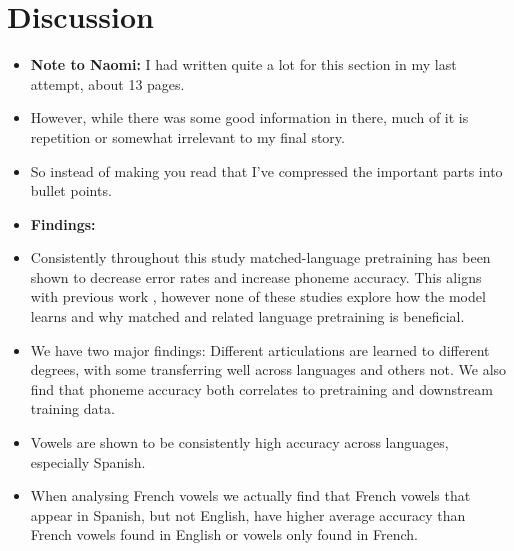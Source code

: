 \section{Discussion}\label{ed_sec:discussion}
\begin{itemize}
    \item \textbf{Note to Naomi:} I had written quite a lot for this section in my last attempt, about 13 pages.
    \item However, while there was some good information in there, much of it is repetition or somewhat irrelevant to my final story.
    \item So instead of making you read that I've compressed the important parts into bullet points.
    \item \textbf{Findings:}
    \item Consistently throughout this study matched-language pretraining has been shown to decrease error rates and increase phoneme accuracy. This aligns with previous work \cite{ashihara2023exploration, poncelet2021comparison, zhang2023fast, gupta2021clsril}, however none of these studies explore how the model learns and why matched and related language pretraining is beneficial.
    \item We have two major findings: Different articulations are learned to different degrees, with some transferring well across languages and others not. We also find that phoneme accuracy both correlates to pretraining and downstream training data.
    \item Vowels are shown to be consistently high accuracy across languages, especially Spanish. 
    \item When analysing French vowels we actually find that French vowels that appear in Spanish, but not English, have higher average accuracy than French vowels found in English or vowels only found in French.

\end{itemize}
